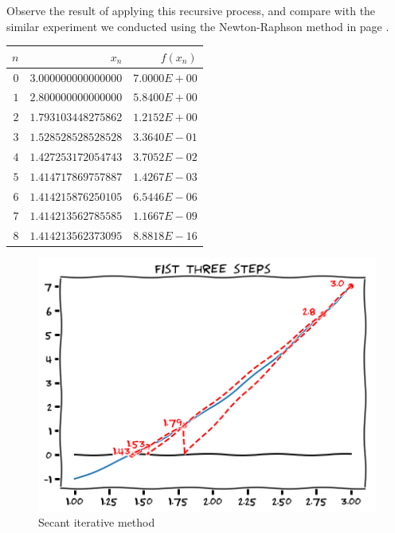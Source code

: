 \begin{example}
Observe the result of applying this recursive process, and compare with the similar experiment we conducted using the Newton-Raphson method in page \pageref{table:Newton-Raphson}.
\begin{center}
\begin{tabular}{|r|r|r|} \hline
$n$ & $x_n$ & $f(x_n)$ \\ \hline \hline
$0$ & $3.000000000000000$ & $7.0000E+00$ \\ \hline
$1$ & $2.800000000000000$ & $5.8400E+00$ \\ \hline
$2$ & $1.793103448275862$ & $1.2152E+00$ \\ \hline
$3$ & $1.528528528528528$ & $3.3640E-01$ \\ \hline
$4$ & $1.427253172054743$ & $3.7052E-02$ \\ \hline
$5$ & $1.414717869757887$ & $1.4267E-03$ \\ \hline
$6$ & $1.414215876250105$ & $6.5446E-06$ \\ \hline
$7$ & $1.414213562785585$ & $1.1667E-09$ \\ \hline
$8$ & $1.414213562373095$ & $8.8818E-16$ \\ \hline
\end{tabular}
\end{center}
\begin{figure}[ht!]
\includegraphics[width=0.6\linewidth]{images/secant.png}
\caption{Secant iterative method}\label{figure:SecantMethod}
\end{figure}
\end{example}

